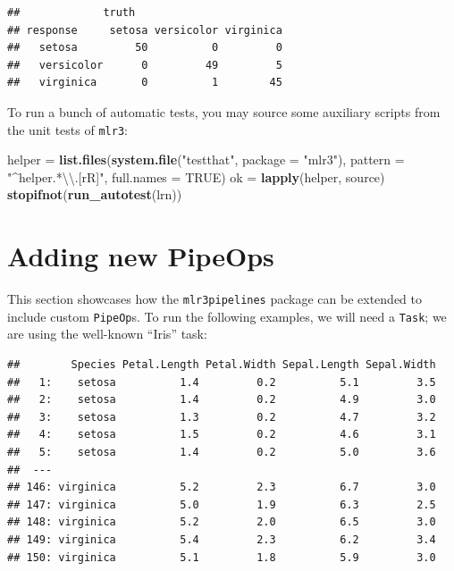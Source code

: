 \documentclass[]{scrbook}
\newenvironment{Shaded}{\begin{snugshade}}{\end{snugshade}}
\newcommand{\CharTok}[1]{\textcolor[rgb]{0.31,0.60,0.02}{#1}}
\newcommand{\DataTypeTok}[1]{\textcolor[rgb]{0.13,0.29,0.53}{#1}}
\newcommand{\KeywordTok}[1]{\textcolor[rgb]{0.13,0.29,0.53}{\textbf{#1}}}
\newcommand{\NormalTok}[1]{#1}
\newcommand{\OperatorTok}[1]{\textcolor[rgb]{0.81,0.36,0.00}{\textbf{#1}}}
\newcommand{\OtherTok}[1]{\textcolor[rgb]{0.56,0.35,0.01}{#1}}
\newcommand{\StringTok}[1]{\textcolor[rgb]{0.31,0.60,0.02}{#1}}
\renewenvironment{Shaded} {\begin{snugshade}\small} {\end{snugshade}}
\begin{document}
\begin{verbatim}
##             truth
## response     setosa versicolor virginica
##   setosa         50          0         0
##   versicolor      0         49         5
##   virginica       0          1        45
\end{verbatim}

To run a bunch of automatic tests, you may source some auxiliary scripts from the unit tests of \texttt{mlr3}:

\begin{Shaded}
\begin{Highlighting}[]
\NormalTok{helper =}\StringTok{ }\KeywordTok{list.files}\NormalTok{(}\KeywordTok{system.file}\NormalTok{(}\StringTok{"testthat"}\NormalTok{, }\DataTypeTok{package =} \StringTok{"mlr3"}\NormalTok{), }\DataTypeTok{pattern =} \StringTok{"^helper.*}\CharTok{\textbackslash{}\textbackslash{}}\StringTok{.[rR]"}\NormalTok{, }\DataTypeTok{full.names =} \OtherTok{TRUE}\NormalTok{)}
\NormalTok{ok =}\StringTok{ }\KeywordTok{lapply}\NormalTok{(helper, source)}
\KeywordTok{stopifnot}\NormalTok{(}\KeywordTok{run_autotest}\NormalTok{(lrn))}
\end{Highlighting}
\end{Shaded}

\hypertarget{extending-pipeops}{%
\section{Adding new PipeOps}\label{extending-pipeops}}

This section showcases how the \texttt{mlr3pipelines} package can be extended to include custom \texttt{PipeOp}s.
To run the following examples, we will need a \texttt{Task}; we are using the well-known ``Iris'' task:

\begin{Shaded}
\end{Shaded}

\begin{verbatim}
##        Species Petal.Length Petal.Width Sepal.Length Sepal.Width
##   1:    setosa          1.4         0.2          5.1         3.5
##   2:    setosa          1.4         0.2          4.9         3.0
##   3:    setosa          1.3         0.2          4.7         3.2
##   4:    setosa          1.5         0.2          4.6         3.1
##   5:    setosa          1.4         0.2          5.0         3.6
##  ---                                                            
## 146: virginica          5.2         2.3          6.7         3.0
## 147: virginica          5.0         1.9          6.3         2.5
## 148: virginica          5.2         2.0          6.5         3.0
## 149: virginica          5.4         2.3          6.2         3.4
## 150: virginica          5.1         1.8          5.9         3.0
\end{verbatim}
\end{document}

